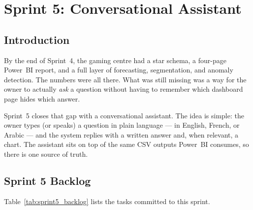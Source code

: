 \documentclass[12pt, a4paper]{report}
\begin{document}
\chapter{Sprint 5: Conversational Assistant}

\section{Introduction}

By the end of Sprint~4, the gaming centre had a star schema, a four-page
Power~BI report, and a full layer of forecasting, segmentation, and
anomaly detection. The numbers were all there. What was still missing was
a way for the owner to actually \emph{ask} a question without having to
remember which dashboard page hides which answer.

Sprint~5 closes that gap with a conversational assistant. The idea is
simple: the owner types (or speaks) a question in plain language --- in
English, French, or Arabic --- and the system replies with a written
answer and, when relevant, a chart. The assistant sits on top of the same
CSV outputs Power~BI consumes, so there is one source of truth.

\section{Sprint 5 Backlog}

Table~\ref{tab:sprint5_backlog} lists the tasks committed to this sprint.
\end{document}
